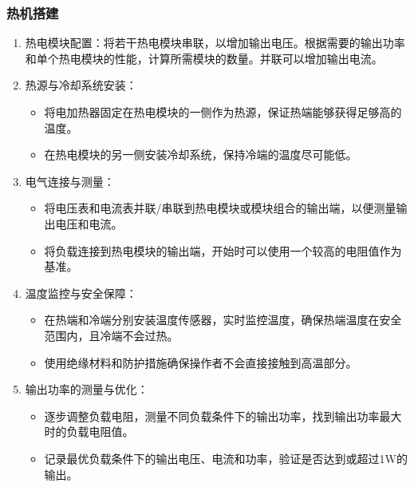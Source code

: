 \documentclass[dvipsnames, svgnames,a4paper,11pt]{article}
\begin{document}
	\begin{figure}[htbp]
		\centering
	\end{figure}
	
	\subsubsection{热机搭建}
	
	\begin{enumerate}
		\item 热电模块配置：将若干热电模块串联，以增加输出电压。根据需要的输出功率和单个热电模块的性能，计算所需模块的数量。并联可以增加输出电流。
		
		\item 热源与冷却系统安装：
		\begin{itemize}
			\item 将电加热器固定在热电模块的一侧作为热源，保证热端能够获得足够高的温度。
			\item 在热电模块的另一侧安装冷却系统，保持冷端的温度尽可能低。
		\end{itemize}				
		
		\item 电气连接与测量：
		\begin{itemize}
			\item 将电压表和电流表并联/串联到热电模块或模块组合的输出端，以便测量输出电压和电流。
			\item 将负载连接到热电模块的输出端，开始时可以使用一个较高的电阻值作为基准。
		\end{itemize}
		
		\item 温度监控与安全保障：
		\begin{itemize}
			\item 在热端和冷端分别安装温度传感器，实时监控温度，确保热端温度在安全范围内，且冷端不会过热。
			\item 使用绝缘材料和防护措施确保操作者不会直接接触到高温部分。
		\end{itemize}
		
		\item 输出功率的测量与优化：
		\begin{itemize}
			\item 逐步调整负载电阻，测量不同负载条件下的输出功率，找到输出功率最大时的负载电阻值。
			\item 记录最优负载条件下的输出电压、电流和功率，验证是否达到或超过1W的输出。
		\end{itemize}
	\end{enumerate}
	
\end{document}
